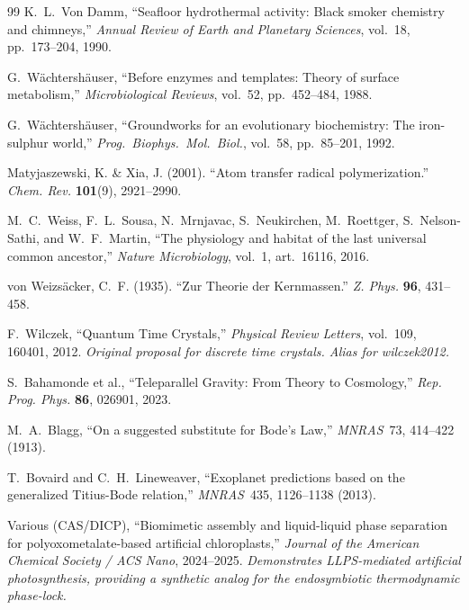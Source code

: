 \documentclass[12pt,oneside]{book}
\begin{document}
\begin{thebibliography}{99}
K.~L.~Von Damm,
``Seafloor hydrothermal activity: Black smoker chemistry and chimneys,''
\emph{Annual Review of Earth and Planetary Sciences}, vol.~18, pp.~173--204, 1990.

G.~W\"achtersh\"auser,
``Before enzymes and templates: Theory of surface metabolism,''
\emph{Microbiological Reviews}, vol.~52, pp.~452--484, 1988.

G.~W\"achtersh\"auser,
``Groundworks for an evolutionary biochemistry: The iron-sulphur world,''
\emph{Prog.\ Biophys.\ Mol.\ Biol.}, vol.~58, pp.~85--201, 1992.

Matyjaszewski, K. \& Xia, J. (2001).
``Atom transfer radical polymerization.''
\textit{Chem. Rev.} \textbf{101}(9), 2921--2990.

M.~C.~Weiss, F.~L.~Sousa, N.~Mrnjavac, S.~Neukirchen, M.~Roettger,
S.~Nelson-Sathi, and W.~F.~Martin,
``The physiology and habitat of the last universal common ancestor,''
\emph{Nature Microbiology}, vol.~1, art.~16116, 2016.


von Weizs\"acker, C.~F. (1935).
``Zur Theorie der Kernmassen.''
\textit{Z. Phys.} \textbf{96}, 431--458.

F.~Wilczek,
``Quantum Time Crystals,''
\emph{Physical Review Letters}, vol.~109, 160401, 2012.
\textit{Original proposal for discrete time crystals. Alias for wilczek2012.}

S.~Bahamonde et al., ``Teleparallel Gravity: From Theory to Cosmology,'' \emph{Rep. Prog. Phys.} \textbf{86}, 026901, 2023.

M.~A.~Blagg, ``On a suggested substitute for Bode's Law,'' \emph{MNRAS}\ 73, 414--422 (1913).

T.~Bovaird and C.~H.~Lineweaver, ``Exoplanet predictions based on the generalized Titius-Bode relation,'' \emph{MNRAS}\ 435, 1126--1138 (2013).

Various (CAS/DICP),
``Biomimetic assembly and liquid-liquid phase separation for polyoxometalate-based artificial chloroplasts,''
\emph{Journal of the American Chemical Society / ACS Nano}, 2024--2025.
\textit{Demonstrates LLPS-mediated artificial photosynthesis, providing a synthetic analog for the endosymbiotic thermodynamic phase-lock.}


\end{thebibliography}
\end{document}
